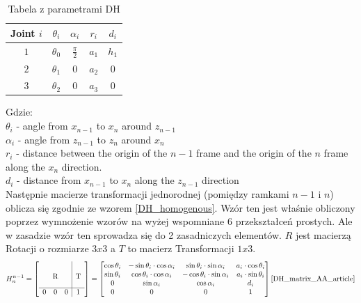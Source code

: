 \documentclass[a4paper,13pt]{article}
\begin{document}
\begin{table}[h!]
\centering
\begin{tabular}{c | c c c c }
 Joint $i$ & $\theta_i$ & $\alpha_i$ & $r_i$ & $d_i$ \\
 \hline
 $1$  & $\theta_0$ & $\frac{\pi}{2}$ & $a_1$ & $h_1$ \\
 $2$  & $\theta_1$ & $0$ & $a_2$ & $0$ \\
 $3$  & $\theta_2$ & $0$ & $a_3$ & $0$ \\
\end{tabular}
\caption{Tabela z parametrami DH}
\label{table:DH_table}
\end{table}

Gdzie: \\
$\theta_i$ - angle from $x_{n-1}$ to $x_n$ around $z_{n-1}$\\
$\alpha_i$ - angle from $z_{n-1}$ to $z_n$ around $x_n$\\
$r_i$ - distance between the origin of the $n-1$ frame and the origin of the $n$ frame along the $x_n$ direction.\\ 
$d_i$ - distance from $x_{n-1}$ to $x_n$ along the $z_{n-1}$ direction\\

Następnie macierze transformacji jednorodnej (pomiędzy ramkami $n-1$ i $n$) oblicza się zgodnie ze wzorem \ref{DH_homogenous}. Wzór ten jest właśnie obliczony poprzez wymnożenie wzorów na wyżej wspomniane 6 przekształceń prostych. Ale w zasadzie wzór ten sprowadza się do 2 zasadniczych elementów. $R$ jest macierzą Rotacji o rozmiarze $3x3$ a $T$ to macierz Transformacji $1x3$. \\

\begin{equation} \label{DH_homogenous}
H^{n-1}_n = 
\left[\begin{array}{ccc|c}
&&&\\
&&&\\
\multicolumn{3}{c|}{\smash{\raisebox{0.75\normalbaselineskip}{R}}} & \smash{\raisebox{0.75\normalbaselineskip}{T}}\\
\hline
0 & 0 & 0 & 1\\
\end{array}\right] = 
\left[\begin{matrix}
\cos{\theta_i} & -\sin{\theta_i} \cdot \cos{\alpha_i} & \sin{\theta_i} \cdot \sin{\alpha_i} & a_i \cdot \cos{\theta_i}\\
\sin{\theta_i} & \cos{\theta_i} \cdot \cos{\alpha_i} & -\cos{\theta_i} \cdot \sin{\alpha_i} & a_i \cdot \sin{\theta_i}\\
0 & \sin{\alpha_i} & \cos{\alpha_i} & d_i\\
0 & 0 & 0 & 1\\
\end{matrix}\right]\cite{DH_matrix_AA_article}
\end{equation}
\end{document}
